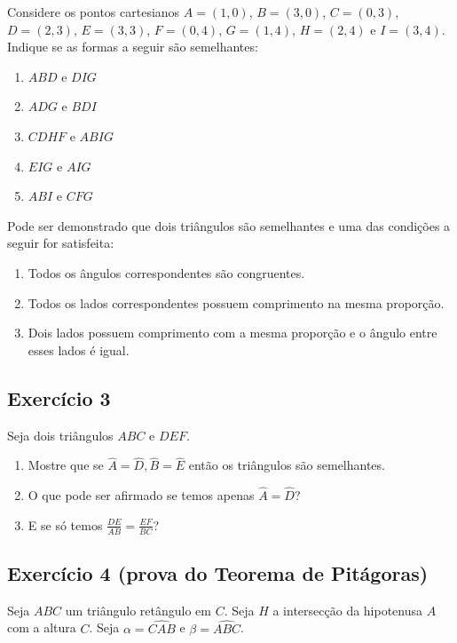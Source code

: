 Considere os pontos cartesianos
$A=(1,0)$, $B=(3,0)$, $C=(0,3)$,
$D=(2,3)$, $E=(3,3)$, $F=(0,4)$, $G=(1,4)$, $H=(2,4)$ e $I=(3,4)$.
Indique se as formas a seguir são semelhantes:

\begin{enumerate}
\item $ABD$ e $DIG$
\item $ADG$ e $BDI$
\item $CDHF$ e $ABIG$
\item $EIG$ e $AIG$
\item $ABI$ e $CFG$
\end{enumerate}

Pode ser demonstrado que dois triângulos são semelhantes e uma das condições a
seguir for satisfeita:

\begin{enumerate}
  \item Todos os ângulos correspondentes são congruentes.
  \item Todos os lados correspondentes possuem comprimento na mesma proporção.
\item Dois lados possuem comprimento com a mesma proporção e o ângulo entre
  esses lados é igual.
\end{enumerate}

\subsection{Exercício 3}

Seja dois triângulos $ABC$ e $DEF$.

\begin{enumerate}
\item Mostre que
  se $\widehat{A} = \widehat{D}, \widehat{B} = \widehat{E}$
  então os triângulos são semelhantes.
\item O que pode ser afirmado se temos apenas $\widehat{A} = \widehat{D}$?
\item E se só temos $\frac{DE}{AB} = \frac{EF}{BC}$?
\end{enumerate}

\subsection{Exercício 4 (prova do Teorema de Pitágoras)}

Seja $ABC$ um triângulo retângulo em $C$. Seja $H$ a intersecção da hipotenusa
$A$ com a altura $C$. Seja $\alpha = \widehat{CAB}$
e $\beta=\widehat{ABC}$.

